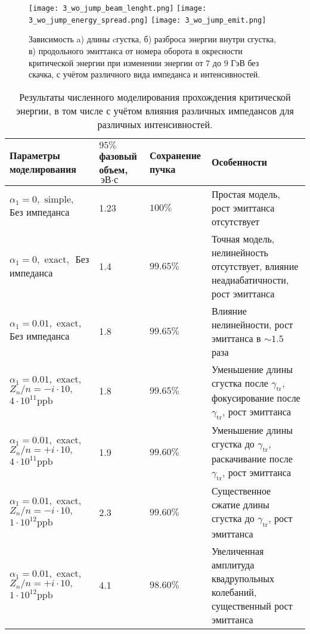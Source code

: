 \begin{figure} [h!]
   \texttt{[image: 3\_wo\_jump\_beam\_lenght.png]}
   \texttt{[image: 3\_wo\_jump\_energy\_spread.png]}
   \texttt{[image: 3\_wo\_jump\_emit.png]}
   \caption{Зависимость a) длины cгустка, б) разброса энергии внутри сгустка, в) продольного эмиттанса от номера оборота в окресности критической энергии при изменении энергии от $7$ до $9$ ГэВ без скачка, с учётом различного вида импеданса и интенсивностей.}
   \label{fig:3_wo_jump}
\end{figure}

\begin{table}
\begin{center}
\begin{tabular}{| m{4cm} | M{2.5cm} | M{2.5cm} | m{6.6cm} |}
\hline 
Параметры моделирования & $95 \%$ фазовый объем, $\text{эВ}\cdot\text{с}$ & Сохранение пучка & Особенности \\
\hline
$\alpha_1=0, \text { simple, }$ Без импеданса & 1.23 & $100\%$ & Простая модель, рост эмиттанса отсутствует \\
\hline 
$\alpha_1=0, \text { exact, }$ Без импеданса & 1.4 & $99.65\%$ & Точная модель, нелинейность отсутствует, влияние неадиабатичности, рост эмиттанса \\
\hline 
$\alpha_1=0.01, \text { exact, }$ Без импеданса & 1.8 & $99.65\%$ & Влияние нелинейности, рост эмиттанса в $\sim 1.5$ раза \\
\hline 
$
 \alpha_1=0.01, \text { exact, }$
$ Z_n / n=-i \cdot 10, \quad$
$4 \cdot 10^{11} \mathrm{ppb} $
 & 1.8 & $99.65\%$ & Уменьшение длины сгустка после $\gamma_{\mathrm{tr}}$, фокусирование после $\gamma_{\mathrm{tr}}$, рост эмиттанса \\
\hline 
$
\alpha_1=0.01, \text { exact, }$ 
$ Z_n / n=+i \cdot 10, \quad$
$4 \cdot 10^{11} \mathrm{ppb} $
 & 1.9 & $99.60\%$ & Уменьшение длины сгустка до $\gamma_{\mathrm{tr}}$, раскачивание после $\gamma_{\mathrm{tr}}$, рост эмиттанса \\
\hline 
$
\alpha_1=0.01, \text { exact, } $ 
$Z_n / n=-i \cdot 10, \quad$
$1 \cdot 10^{12} \mathrm{ppb}$
 & 2.3 & $99.60\%$ & Существенное сжатие длины сгустка до $\gamma_{\mathrm{tr}}$, рост эмиттанса \\
\hline 
$
 \alpha_1=0.01, \text { exact, } $ 
$ Z_n / n=+i \cdot 10, \quad$
$ 1 \cdot 10^{12} \mathrm{ppb}$
 & 4.1 & $98.60\%$ & Увеличенная амплитуда квадрупольных колебаний, существенный рост эмиттанса \\
\hline
\end{tabular}
\end{center}
\caption{Результаты численного моделирования прохождения критической энергии, в том числе с учётом влияния различных импедансов для различных интенсивностей.}
\label{tbl:u-70_crossing}
\end{table}


